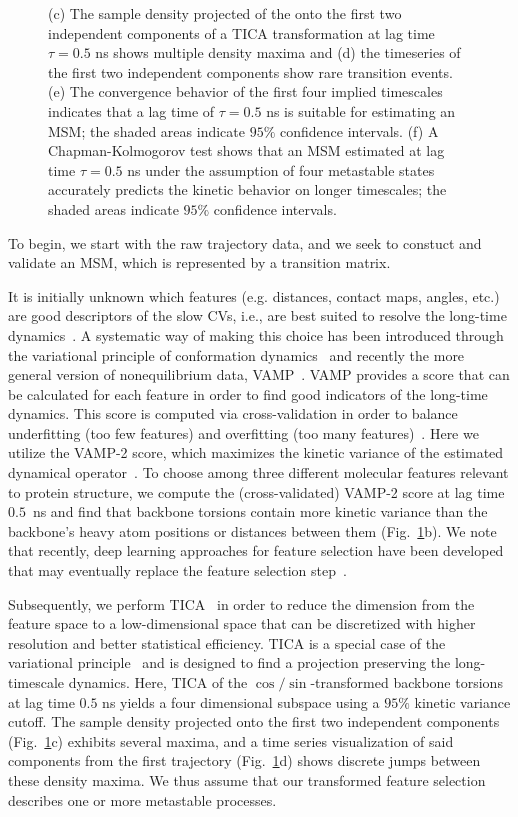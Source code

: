 \documentclass[9pt,tutorial]{livecoms}
\begin{document}
\begin{figure}
{(c) The  sample density projected of the onto the first two independent components of a TICA transformation at lag time $\tau=0.5$ ns shows multiple density maxima and
(d) the timeseries of the first two independent components show rare transition events.
(e) The convergence behavior of the first four implied timescales indicates that a lag time of $\tau=0.5$ ns is suitable for estimating an MSM;
the shaded areas indicate $95\%$ confidence intervals. (f) A Chapman-Kolmogorov test shows that an MSM estimated at lag time $\tau=0.5$ ns under the assumption of four metastable states accurately predicts the kinetic behavior on longer timescales;
the shaded areas indicate $95\%$ confidence intervals.}
\label{fig:io-to-ck}
\end{figure}

To begin, we start with the raw trajectory data, and we seek to constuct and validate an MSM, which is represented by a transition matrix.

It is initially unknown which features (e.g. distances, contact maps, angles, etc.) are good descriptors of the slow CVs, i.e., are best suited to resolve the long-time dynamics~\cite{NoeClementiReview}.
A systematic way of making this choice has been introduced through the variational principle of conformation dynamics~\cite{noe-vac,nueske-vamk} and recently the more general version of nonequilibrium data, VAMP~\cite{vamp-preprint}.
VAMP provides a score that can be calculated for each feature in order to find good indicators of the long-time dynamics.
This score is computed via cross-validation in order to balance underfitting (too few features) and overfitting (too many features)~\cite{gmrq}.
Here we utilize the VAMP-2 score, which maximizes the kinetic variance of the estimated dynamical operator~\cite{kinetic-maps}.
To choose among three different molecular features relevant to protein structure, we compute the (cross-validated) VAMP-2 score at lag time $0.5$~ns and find that backbone torsions contain more kinetic variance than the backbone's heavy atom positions or distances between them (Fig.~\ref{fig:io-to-ck}b).
We note that recently, deep learning approaches for feature selection have been developed that may eventually replace the feature selection step~\cite{vampnet,tae,hernandez-vde}.

Subsequently, we perform TICA~\cite{tica,kinetic-maps} in order to reduce the dimension from the feature space to a low-dimensional space that can be discretized with higher resolution and better statistical efficiency. TICA is a special case of the variational principle~\cite{noe-vac,nueske-vamk} and is designed to find a projection preserving the long-timescale dynamics. Here, TICA of the $\cos/\sin$-transformed backbone torsions at lag time $0.5$ ns yields a four dimensional subspace using a $95\%$ kinetic variance cutoff.
The sample density projected onto the first two independent components (Fig.~\ref{fig:io-to-ck}c) exhibits several maxima, and a time series visualization of said components from the first trajectory (Fig.~\ref{fig:io-to-ck}d) shows discrete jumps between these density maxima.
We thus assume that our transformed feature selection describes one or more metastable processes.
\end{document}
